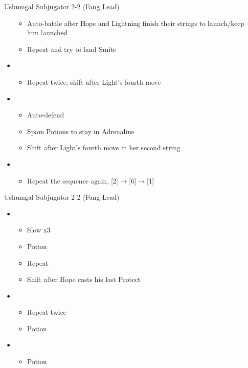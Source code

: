 \begin{paracol}{2}
\begin{battle}{Ushumgal Subjugator 2-2 (Fang Lead)}
\begin{itemize}
			      \begin{itemize}
				      \item Auto-battle after Hope and Lightning finish their strings to launch/keep him launched
				      \item Repeat and try to land Smite
			      \end{itemize}
			\item \third
			      \begin{itemize}
				      \item Repeat twice, shift after Light's fourth move
			      \end{itemize}
			\item \fourth
			      \begin{itemize}
				      \item Auto-defend
				      \item Spam Potions to stay in Adrenaline
				      \item Shift after Light's fourth move in her second string
			      \end{itemize}
			\item \second
			      \begin{itemize}
				      \item Repeat the sequence again, [2]$\rightarrow$[6]$\rightarrow$[1]
			      \end{itemize}
		\end{itemize}
	\end{battle}
	\switchcolumn
	\begin{battle}{Ushumgal Subjugator 2-2 (Fang Lead)}
		\begin{itemize}
			\item \fifth
			      \begin{itemize}
				      \item Slow x3
				      \item Potion
				      \item Repeat
				      \item Shift after Hope casts his last Protect
			      \end{itemize}
			\item \third
			      \begin{itemize}
				      \item Repeat twice
				      \item Potion
			      \end{itemize}
			\item \second
			      \begin{itemize}
				      \item Potion

\end{itemize}
\end{itemize}
\end{battle}
\end{paracol}
